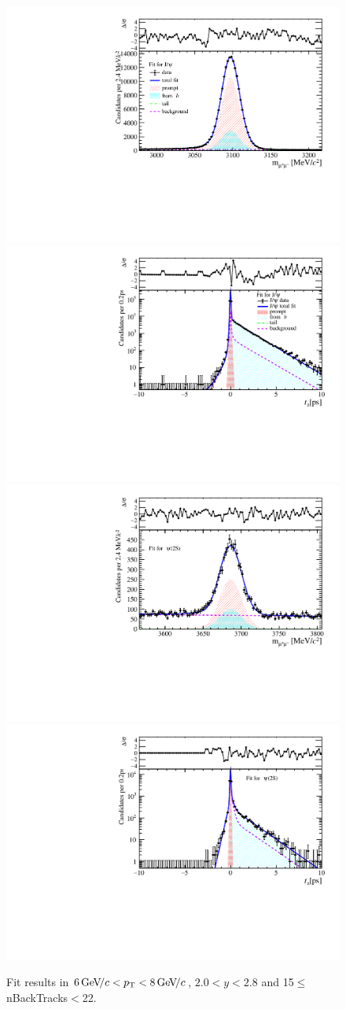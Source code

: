 \begin{figure}[H]
\begin{center}
\includegraphics[width=0.47\linewidth]{pdf/Jpsi/drawmassB/n3y1pt4.pdf}
\includegraphics[width=0.47\linewidth]{pdf/Jpsi/2DFitB/n3y1pt4.pdf}
\vspace*{-0.5cm}
\includegraphics[width=0.47\linewidth]{pdf/Psi2S/drawmassB/n3y1pt4.pdf}
\includegraphics[width=0.47\linewidth]{pdf/Psi2S/2DFitB/n3y1pt4.pdf}
\vspace*{-0.5cm}
\end{center}
\caption{Fit results in $6\text{\,Ge\kern -0.1em V\!/}c<p_{\mathrm{T}}<8\text{\,Ge\kern -0.1em V\!/}c$, $2.0<y<2.8$ and 15$\leq$nBackTracks$<$22.}
\label{Fitn3y1pt4}
\end{figure}
